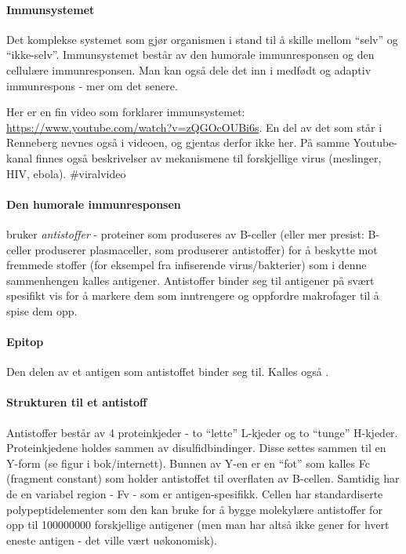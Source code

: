 
\paragraph{Immunsystemet} Det komplekse systemet som gjør organismen i stand til å skille mellom ``selv'' og ``ikke-selv''. Immunsystemet består av den humorale immunresponsen og den cellulære immunresponsen. Man kan også dele det inn i medfødt og adaptiv immunrespons - mer om det senere.

Her er en fin video som forklarer immunsystemet: \url{https://www.youtube.com/watch?v=zQGOcOUBi6s}. En del av det som står i Renneberg nevnes også i videoen, og gjentas derfor ikke her. På samme Youtube-kanal finnes også beskrivelser av mekanismene til forskjellige virus (meslinger, HIV, ebola). \#viralvideo

\paragraph{Den humorale immunresponsen} bruker \emph{antistoffer} - proteiner som produseres av B-celler (eller mer presist: B-celler produserer plasmaceller, som produserer antistoffer) for å beskytte mot fremmede stoffer (for eksempel fra infiserende virus/bakterier) som i denne sammenhengen kalles antigener. Antistoffer binder seg til antigener på svært spesifikt vis for å markere dem som inntrengere og oppfordre makrofager til å spise dem opp.

\paragraph{Epitop} Den delen av et antigen som antistoffet binder seg til. Kalles også . 

\paragraph{Strukturen til et antistoff} Antistoffer består av 4 proteinkjeder - to ``lette'' L-kjeder og to ``tunge'' H-kjeder. Proteinkjedene holdes sammen av disulfidbindinger. Disse settes sammen til en Y-form (se figur i bok/internett). Bunnen av Y-en er en ``fot'' som kalles Fc (fragment constant) som holder antistoffet til overflaten av  B-cellen. Samtidig har de en variabel region - Fv - som er antigen-spesifikk. Cellen har standardiserte polypeptidelementer som den kan bruke for å bygge molekylære antistoffer for opp til 100000000 forskjellige antigener (men man har altså ikke gener for hvert eneste antigen - det ville vært uøkonomisk).

